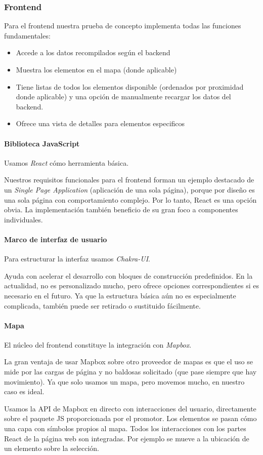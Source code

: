 \subsubsection{Frontend}

Para el frontend nuestra prueba de concepto implementa todas las funciones fundamentales:
\begin{itemize}
    \item Accede a los datos recompilados según el backend
    \item Muestra los elementos en el mapa (donde aplicable)
    \item Tiene listas de todos los elementos disponible (ordenados por proximidad donde aplicable) y una opción de manualmente recargar los datos del backend.
    \item Ofrece una vista de detalles para elementos especificos
\end{itemize}

\paragraph{Biblioteca JavaScript}
Usamos \emph{React} cómo herramienta básica.

Nuestros requisitos funcionales para el frontend forman un ejemplo destacado de un \emph{Single Page Application} (aplicación de una sola página), porque por diseño es una sola página con comportamiento complejo. Por lo tanto,
React es una opción obvia. La implementación también beneficio de su gran foco a componentes individuales.

\paragraph{Marco de interfaz de usuario}
Para estructurar la interfaz usamos \emph{Chakra-UI}.

Ayuda con acelerar el desarrollo con bloques de construcción predefinidos. En la actualidad, no es personalizado mucho, pero ofrece opciones correspondientes si es necesario en el futuro. Ya que la estructura básica aún no es especialmente complicada, también puede ser retirado o sustituido fácilmente.

\paragraph{Mapa}
El núcleo del frontend constituye la integración con \emph{Mapbox}.

La gran ventaja de usar Mapbox sobre otro proveedor de mapas es que el uso se mide por las cargas de página y no baldosas solicitado (que pase siempre que hay movimiento). Ya que solo usamos un mapa, pero movemos mucho,
en nuestro caso es ideal.

Usamos la API de Mapbox en directo con interacciones del usuario, directamente sobre el paquete JS proporcionada por el promotor.
Los elementos se pasan cómo una capa con símbolos propios al mapa.
Todos los interacciones con los partes React de la página web son integradas. Por ejemplo se mueve a la ubicación de un elemento sobre la selección.